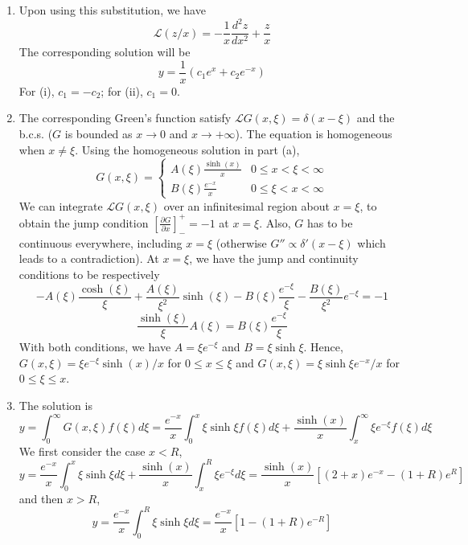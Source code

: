 \documentclass[a4paper]{article}
\begin{document}
\begin{ans}\leavevmode
\begin{enumerate}[label=(\alph*)]
\item Upon using this substitution, we have
$$\mathcal{L}(z/x)=-\frac{1}{x}\frac{d^2z}{dx^2}+\frac{z}{x}$$
The corresponding solution will be
$$y=\frac{1}{x}(c_1e^x+c_2e^{-x})$$
For (i), $c_1=-c_2$; for (ii), $c_1=0$.
\item The corresponding Green's function satisfy $\mathcal{L}G(x,\xi)=\delta(x-\xi)$ and the b.c.s. ($G$ is bounded as $x\rightarrow 0$ and $x\rightarrow+\infty$). The equation is homogeneous when $x\neq\xi$. Using the homogeneous solution in part (a),
$$G(x,\xi)=
\left\{
        \begin{array}{ll}
      A(\xi)\frac{\sinh(x)}{x} & 0\leq x<\xi<\infty\\
      B(\xi)\frac{e^{-x}}{x} & 0\leq\xi<x<\infty
        \end{array}
    \right.$$
We can integrate $\mathcal{L}G(x,\xi)$ over an infinitesimal region about $x=\xi$, to obtain the jump condition $[\frac{\partial G}{\partial x}]_-^+=-1$ at $x=\xi$. Also, $G$ has to be continuous everywhere, including $x=\xi$ (otherwise $G''\propto\delta'(x-\xi)$ which leads to a contradiction). At $x=\xi$, we have the jump and continuity conditions to be respectively
$$-A(\xi)\frac{\cosh(\xi)}{\xi}+\frac{A(\xi)}{\xi^2}\sinh(\xi)-B(\xi)\frac{e^{-\xi}}{\xi}-\frac{B(\xi)}{\xi^2}e^{-\xi}=-1$$
$$\frac{\sinh(\xi)}{\xi}A(\xi)=B(\xi)\frac{e^{-\xi}}{\xi}$$
With both conditions, we have $A=\xi e^{-\xi}$ and $B=\xi\sinh\xi$. Hence, $G(x,\xi)=\xi e^{-\xi}\sinh(x)/x$ for $0\leq x\leq\xi$ and $G(x,\xi)=\xi\sinh\xi e^{-x}/x$ for $0\leq\xi\leq x$. \item The solution is
$$y=\int_0^\infty G(x,\xi)f(\xi)d\xi=\frac{e^{-x}}{x}\int_0^x\xi\sinh\xi f(\xi) d\xi+\frac{\sinh(x)}{x}\int_x^\infty\xi e^{-\xi}f(\xi)d\xi$$
We first consider the case $x<R$,
$$y=\frac{e^{-x}}{x}\int_0^x\xi\sinh\xi d\xi+\frac{\sinh(x)}{x}\int_x^R\xi e^{-\xi}d\xi=\frac{\sinh(x)}{x}[(2+x)e^{-x}-(1+R)e^R]$$
and then $x>R$,
$$y=\frac{e^{-x}}{x}\int_0^R\xi\sinh\xi d\xi=\frac{e^{-x}}{x}[1-(1+R)e^{-R}]$$
\end{enumerate}
\end{ans}
\newpage
\end{document}
